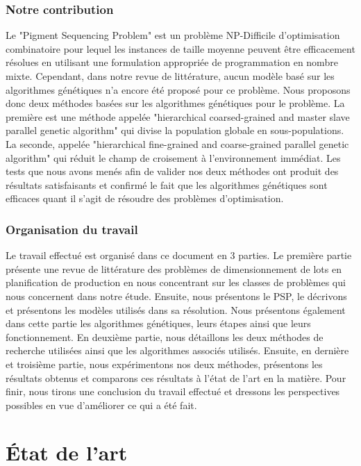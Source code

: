 \documentclass[12pt,a4paper]{article}
\begin{document}
	\section*{Notre contribution}
	Le "Pigment Sequencing Problem" est un problème NP-Difficile d'optimisation combinatoire pour lequel les instances de taille moyenne peuvent être efficacement résolues en utilisant une formulation appropriée de programmation en nombre mixte. Cependant, dans notre revue de littérature, aucun modèle basé sur les algorithmes génétiques n'a encore été proposé pour ce problème. Nous proposons donc deux méthodes basées sur les algorithmes génétiques pour le problème. La première est une méthode appelée "hierarchical coarsed-grained and master slave parallel genetic algorithm" qui divise la population globale en sous-populations. La seconde, appelée "hierarchical fine-grained and coarse-grained parallel genetic algorithm" qui réduit le champ de croisement à l'environnement immédiat. Les tests que nous avons menés afin de valider nos deux méthodes ont produit des résultats satisfaisants et confirmé le fait que les algorithmes génétiques sont efficaces quant il s'agit de résoudre des problèmes d'optimisation. 
	 
	\section*{Organisation du travail}

	Le travail effectué est organisé dans ce document en 3 parties. Le première partie présente une revue de littérature des problèmes de dimensionnement de lots en planification de production en nous concentrant sur les classes de problèmes qui nous concernent dans notre étude. Ensuite, nous présentons le PSP, le décrivons et présentons les modèles utilisés dans sa résolution. Nous présentons également dans cette partie les algorithmes génétiques, leurs étapes ainsi que leurs fonctionnement. En deuxième partie, nous détaillons les deux méthodes de recherche utilisées ainsi que les algorithmes associés utilisés. Ensuite, en dernière et troisième partie, nous expérimentons  nos deux méthodes, présentons les résultats obtenus et comparons ces résultats à l'état de l'art en la matière. Pour finir, nous tirons une conclusion du travail effectué et dressons les perspectives possibles en vue d'améliorer ce qui a été fait.
	
	\newpage
	
	\part{État de l'art}
\end{document}
